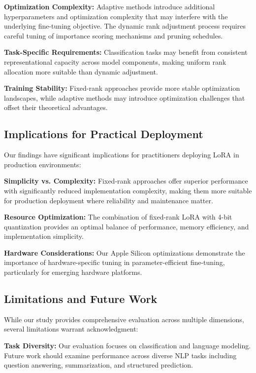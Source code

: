 \documentclass[11pt,a4paper]{article}
\begin{document}
\textbf{Optimization Complexity:} Adaptive methods introduce additional hyperparameters and optimization complexity that may interfere with the underlying fine-tuning objective. The dynamic rank adjustment process requires careful tuning of importance scoring mechanisms and pruning schedules.

\textbf{Task-Specific Requirements:} Classification tasks may benefit from consistent representational capacity across model components, making uniform rank allocation more suitable than dynamic adjustment.

\textbf{Training Stability:} Fixed-rank approaches provide more stable optimization landscapes, while adaptive methods may introduce optimization challenges that offset their theoretical advantages.

\subsection{Implications for Practical Deployment}

Our findings have significant implications for practitioners deploying LoRA in production environments:

\textbf{Simplicity vs. Complexity:} Fixed-rank approaches offer superior performance with significantly reduced implementation complexity, making them more suitable for production deployment where reliability and maintenance matter.

\textbf{Resource Optimization:} The combination of fixed-rank LoRA with 4-bit quantization provides an optimal balance of performance, memory efficiency, and implementation simplicity.

\textbf{Hardware Considerations:} Our Apple Silicon optimizations demonstrate the importance of hardware-specific tuning in parameter-efficient fine-tuning, particularly for emerging hardware platforms.

\subsection{Limitations and Future Work}

While our study provides comprehensive evaluation across multiple dimensions, several limitations warrant acknowledgment:

\textbf{Task Diversity:} Our evaluation focuses on classification and language modeling. Future work should examine performance across diverse NLP tasks including question answering, summarization, and structured prediction.
\end{document}
